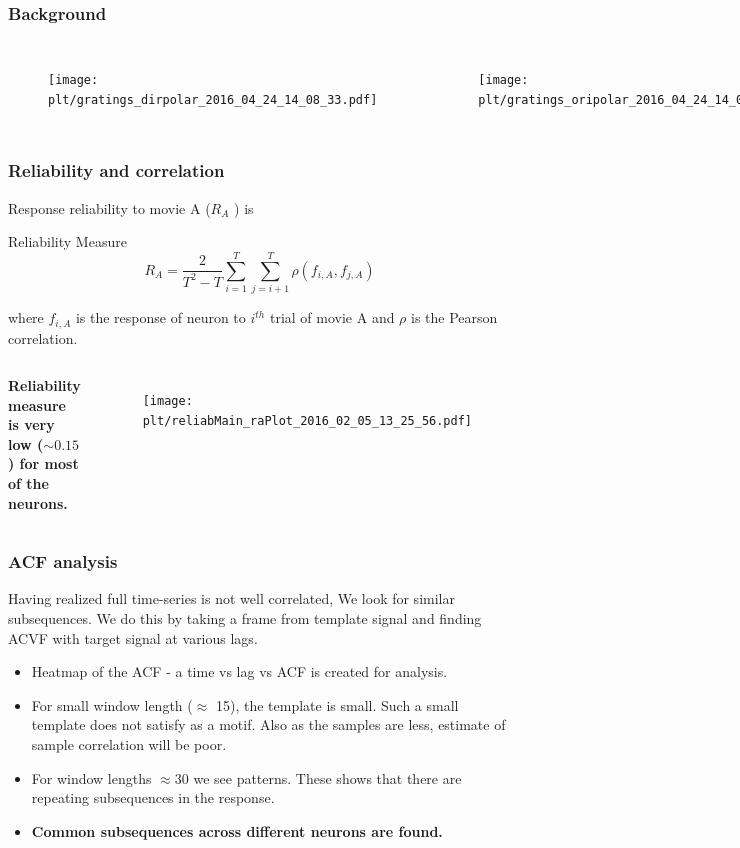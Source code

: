 \documentclass{beamer}
\newcommand{\plt}{../../plots}
\begin{document}
\begin{frame}
\frametitle{Background}
\begin{columns}[c]
\begin{figure}
\texttt{[image: \\plt/gratings\_dirpolar\_2016\_04\_24\_14\_08\_33.pdf]}
\end{figure}
\begin{figure}
\texttt{[image: \\plt/gratings\_oripolar\_2016\_04\_24\_14\_08\_33.pdf]}
\end{figure}
\end{columns}
\end{frame}

\begin{frame}
\frametitle{Reliability and correlation}
Response reliability to movie A ($R_A$ ) is
\begin{block}{Reliability Measure}
$$R_A = \frac{2}{T^2 - T}\sum_{i=1}^T \sum_{j=i+1}^T \rho(f_{i, A}, f_{j, A})$$
\end{block}
where $f_{i, A}$ is the response of neuron to $i^{th}$ trial of movie A and $\rho$ is the Pearson correlation.
\begin{columns}[c]
\textbf{Reliability measure is very low ($\sim 0.15$) for most of the neurons.}
\begin{figure}
\texttt{[image: \\plt/reliabMain\_raPlot\_2016\_02\_05\_13\_25\_56.pdf]}
\end{figure}
\end{columns}
\end{frame}

\begin{frame}
\frametitle{ACF analysis}
Having realized full time-series is not well correlated, We look for similar subsequences.
We do this by taking a frame from template signal and finding ACVF with target signal at various lags.
\begin{itemize}
    \item Heatmap of the ACF - a time vs lag vs ACF is created for analysis.
    \item For small window length ($\approx$ 15), the template is small. Such a small template does not satisfy as a motif. Also as the samples are less, estimate of sample correlation will be poor.
    \item For window lengths $\approx 30$ we see patterns. These shows that there are repeating subsequences in the response.
    \item \textbf{Common subsequences across different neurons are found.}
\end{itemize}
\end{frame}
\end{document}
